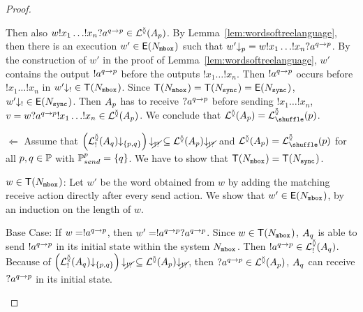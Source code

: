 \documentclass[submission,copyright,creativecommons,UKenglish]{eptcs}
\begin{document}
\begin{proof}
\begin{compactdesc}
\begin{compactenum}
					Then also $ w !x_1 \ldots !x_n ?a^{q \rightarrow p} \in \mathcal{L}^{\between}{\left( A_{p} \right)} $.
					By Lemma~\ref{lem:wordsoftreelanguage}, then there is an execution $ w' \in \mathsf{E}(N_{{\mathtt{mbox}}^{}}) $ such that $ w'{\downarrow_{p}} = w !x_1 \ldots !x_n ?a^{q \rightarrow p} $.
					By the construction of $ w' $ in the proof of Lemma~\ref{lem:wordsoftreelanguage}, $ w' $ contains the output $ !a^{q \rightarrow p} $ before the outputs $ !x_1 \ldots !x_n $.
					Then $ !a^{q \rightarrow p} $ occurs before $ !x_1 \ldots !x_n $ in $ w'{\downarrow_{!}} \in \mathsf{T}(N_{{\mathtt{mbox}}^{}}) $.
					Since $ \mathsf{T}(N_{{\mathtt{mbox}}^{}}) = \mathsf{T}(N_{{\mathtt{sync}}^{}}) = \mathsf{E}(N_{{\mathtt{sync}}^{}}) $, $ w'{\downarrow_{!}} \in \mathsf{E}(N_{{\mathtt{sync}}^{}}) $.
					Then $ A_{p} $ has to receive $ ?a^{q \rightarrow p} $ before sending $ !x_1 \ldots !x_n $, \ie $ v = w ?a^{q \rightarrow p} !x_1 \ldots !x_n \in \mathcal{L}^{\between}{\left( A_{p} \right)} $.
					We conclude that $ \LangTree{\Automaton{p}} = \LangShuffle{p} $.
			\end{compactenum}
		\item[$ \Leftarrow $] Assume that $ \left( \mathcal{L}_{!}^{\between}{\left( A_{q} \right)}{\downarrow_{{\left\lbrace p, q \right\rbrace}}} \right){\downarrow_{\cancel{!?}}} \subseteq \mathcal{L}^{\between}{\left( A_{p} \right)}{\downarrow_{\cancel{!?}}} $ and $ \LangTree{\Automaton{p}} = \LangShuffle{p} $ for all $ p, q \in \mathbb{P} $ with $ \mathbb{P}_{send}^{p} = {\left\lbrace q \right\rbrace} $.
			We have to show that $ \mathsf{T}(N_{{\mathtt{mbox}}^{ }}) = \mathsf{T}(N_{{\mathtt{sync}}^{}}) $.
			\begin{compactdesc}
				\item[$ w \in \mathsf{T}(N_{{\mathtt{mbox}}^{}}) $:] Let $ w' $ be the word obtained from $ w $ by adding the matching receive action directly after every send action.
					We show that $ w' \in \mathsf{E}(N_{{\mathtt{mbox}}^{ }}) $, by an induction on the length of $ w $.
					\begin{compactdesc}
						\item[Base Case:] If $ w = !a^{q \rightarrow p} $, then $ w' = !a^{q \rightarrow p} ?a^{q \rightarrow p} $.
							Since $ w \in \mathsf{T}(N_{{\mathtt{mbox}}^{ }}) $, $ A_{q} $ is able to send $ !a^{q \rightarrow p} $ in its initial state within the system $ N_{{\mathtt{mbox}}^{ }} $.
							Then $ !a^{q \rightarrow p} \in \mathcal{L}_{!}^{\between}{\left( A_{q} \right)} $.
							Because of $ \left( \mathcal{L}_{!}^{\between}{\left( A_{q} \right)}{\downarrow_{{\left\lbrace p, q \right\rbrace}}} \right){\downarrow_{\cancel{!?}}} \subseteq \mathcal{L}^{\between}{\left( A_{p} \right)}{\downarrow_{\cancel{!?}}} $, then $ ?a^{q \rightarrow p} \in \mathcal{L}^{\between}{\left( A_{p} \right)} $, \ie $ A_{q} $ can receive $ ?a^{q \rightarrow p} $ in its initial state.

\end{compactdesc}
\end{compactdesc}
\end{compactdesc}
\end{proof}
\end{document}
